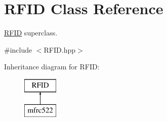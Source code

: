 \hypertarget{class_r_f_i_d}{}\section{R\+F\+ID Class Reference}
\label{class_r_f_i_d}


\hyperlink{class_r_f_i_d}{R\+F\+ID} superclass.  




{\ttfamily \#include $<$R\+F\+I\+D.\+hpp$>$}

Inheritance diagram for R\+F\+ID\+:\begin{figure}[H]
\begin{center}
\leavevmode
\includegraphics[height=2.000000cm]{class_r_f_i_d}
\end{center}
\end{figure}
